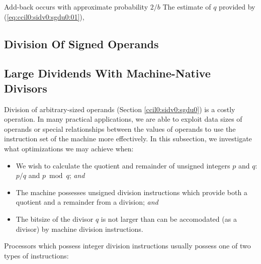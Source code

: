 \begin{vworklemmastatementpar}
{Add-back occurs with approximate probability \mbox{\boldmath$2/b$}}
\label{lem:ccil0:sidv0:sgdu0:05}
The estimate of $q$ provided by (\ref{eq:ccil0:sidv0:sgdu0:01}),
\end{vworklemmastatementpar}
\begin{vworklemmaproof}
\end{vworklemmaproof}
\vworklemmafooter{}


\subsection{Division Of Signed Operands}


\subsection{Large Dividends With Machine-Native Divisors}
\label{ccil0:sidv0:sldm0}

Division of arbitrary-sized operands (Section \ref{ccil0:sidv0:sgdu0}) is
a costly operation.  In many practical applications, we are able to exploit
data sizes of operands or special relationships between the values of
operands to use the instruction set of the machine more effectively.
In this subsection, we investigate what optimizations we may achieve when:

\begin{itemize}
\item We wish to calculate the quotient and remainder of
      unsigned integers $p$ and $q$:  $p/q$ and 
      $p \bmod{} q$; \emph{and}
\item The machine possesses unsigned division instructions
      which provide both a quotient and a remainder from 
      a division; \emph{and}
\item The bitsize of the divisor $q$ is not larger than can
      be accomodated (as a divisor) by machine division instructions.
\end{itemize}

Processors which possess integer division instructions usually
possess one of two types of instructions:

